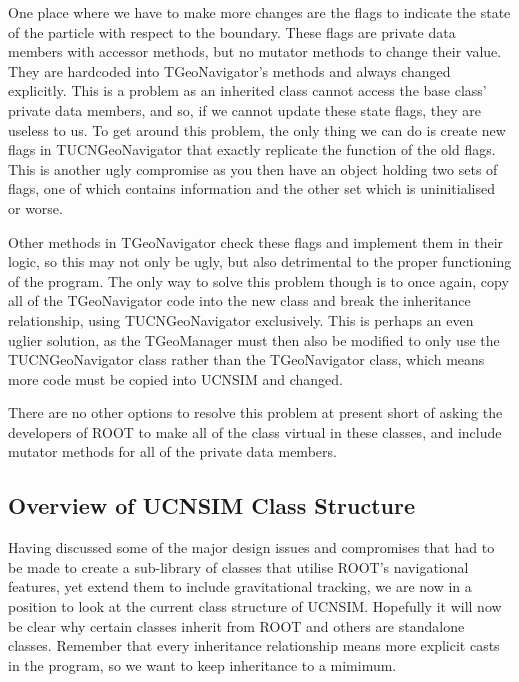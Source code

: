 \documentclass[11pt,a4paper,oneside]{article}
\begin{document}
One place where we have to make more changes are the flags to indicate the state of the particle with respect to the boundary. These flags are private data members with accessor methods, but no mutator methods to change their value. They are hardcoded into TGeoNavigator's methods and always changed explicitly. This is a problem as an inherited class cannot access the base class' private data members, and so, if we cannot update these state flags, they are useless to us. To get around this problem, the only thing we can do is create new flags in TUCNGeoNavigator that exactly replicate the function of the old flags. This is another ugly compromise as you then have an object holding two sets of flags, one of which contains information and the other set which is uninitialised or worse. 

Other methods in TGeoNavigator check these flags and implement them in their logic, so this may not only be ugly, but also detrimental to the proper functioning of the program. The only way to solve this problem though is to once again, copy all of the TGeoNavigator code into the new class and break the inheritance relationship, using TUCNGeoNavigator exclusively. This is perhaps an even uglier solution, as the TGeoManager must then also be modified to only use the TUCNGeoNavigator class rather than the TGeoNavigator class, which means more code must be copied into UCNSIM and changed. 

There are no other options to resolve this problem at present short of asking the developers of ROOT to make all of the class virtual in these classes, and include mutator methods for all of the private data members. 

\subsection{Overview of UCNSIM Class Structure}

Having discussed some of the major design issues and compromises that had to be made to create a sub-library of classes that utilise ROOT's navigational features, yet extend them to include gravitational tracking, we are now in a position to look at the current class structure of UCNSIM. Hopefully it will now be clear why certain classes inherit from ROOT and others are standalone classes. Remember that every inheritance relationship means more explicit casts in the program, so we want to keep inheritance to a mimimum. 
\end{document}
